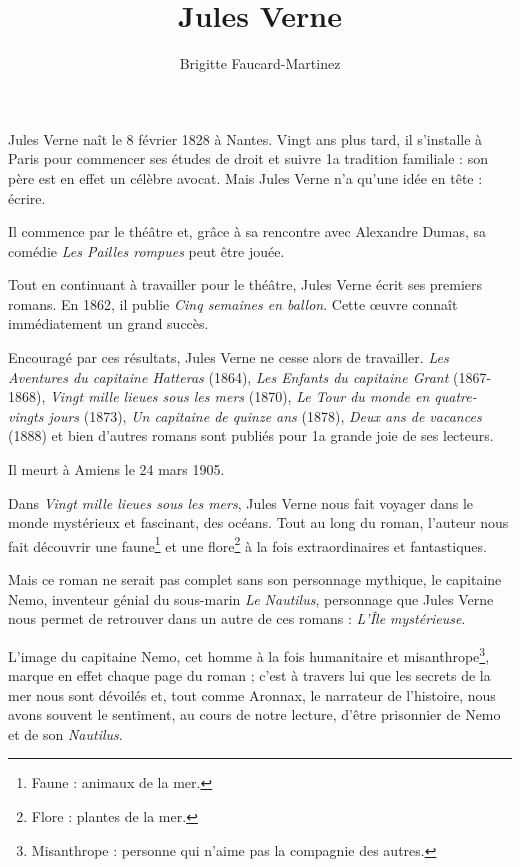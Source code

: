 \documentclass[a5paper,notitlepage]{article}
\author{Brigitte Faucard-Martinez}
\title{Jules Verne}
\begin{document}
\maketitle
Jules Verne naît le 8 février 1828 à Nantes. Vingt ans plus tard, il s'installe à Paris pour commencer ses études de droit et
suivre 1a tradition familiale : son père est en effet un célèbre avocat. Mais Jules Verne n'a qu'une idée en tête : écrire.

Il commence par le théâtre et, grâce à sa rencontre avec Alexandre Dumas, sa comédie \emph{Les Pailles rompues} peut être jouée.

Tout en continuant à travailler pour le théâtre, Jules Verne écrit ses premiers romans. En 1862, il publie \emph{Cinq semaines
en ballon}. Cette \oe{}uvre connaît immédiatement un grand succès.

Encouragé par ces résultats, Jules Verne ne cesse alors de travailler. \emph{Les Aventures du capitaine Hatteras} (1864),
\emph{Les Enfants du capitaine Grant} (1867-1868), \emph{Vingt mille lieues sous les mers} (1870), \emph{Le Tour du monde en
quatre-vingts jours} (1873), \emph{Un capitaine de quinze ans} (1878), \emph{Deux ans de vacances} (1888) et bien d'autres
romans sont publiés pour 1a grande joie de ses lecteurs.

Il meurt à Amiens le 24 mars 1905.

Dans \emph{Vingt mille lieues sous les mers}, Jules Verne nous fait voyager dans le monde mystérieux et fascinant, des océans.
Tout au long du roman, l'auteur nous fait découvrir une faune\footnote{Faune : animaux de la mer.} et une flore\footnote{Flore :
plantes de la mer.} à la fois extraordinaires et fantastiques.

Mais ce roman ne serait pas complet sans son personnage mythique, le capitaine Nemo, inventeur génial du sous-marin \emph{Le
Nautilus}, personnage que Jules Verne nous permet de retrouver dans un autre de ces romans : \emph{L'Île mystérieuse}.

L'image du capitaine Nemo, cet homme à la fois humanitaire et misanthrope\footnote{Misanthrope : personne qui n'aime pas la
compagnie des autres.}, marque en effet chaque page du roman ; c'est à travers lui que les secrets de la mer nous sont dévoilés
et, tout comme Aronnax, le narrateur de l'histoire, nous avons souvent le sentiment, au cours de notre lecture, d'être \og
prisonnier \fg{} de Nemo et de son \emph{Nautilus}.
\end{document}
